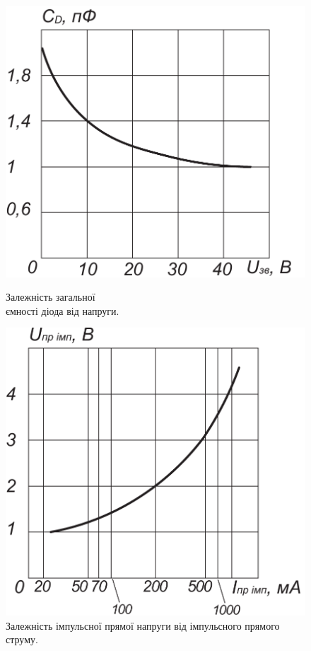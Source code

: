 \documentclass[a4paper,14pt]{extreport}
\begin{document}
  \begin{figure}[h!]\label{im4}
  	\begin{minipage}[h]{0.5\linewidth}
  		\includegraphics[width=1\linewidth]{1.2.13.pdf}
      \caption{Залежність загальної\\ ємності діода від напруги.}
    \end{minipage}
  \hfill
    \begin{minipage}[h]{0.5\linewidth}
  		\includegraphics[width=1\linewidth]{1.2.14.pdf}
      \caption{Залежність імпульсної прямої напруги від імпульсного прямого струму.}
  	\end{minipage}
  \end{figure}
\end{document}
